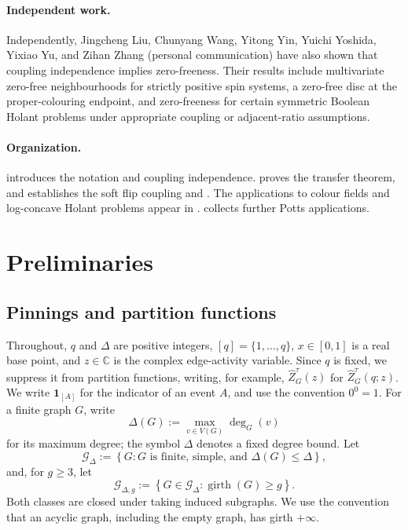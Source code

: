\documentclass[11pt,reqno]{article}
\theoremstyle{plain}
\theoremstyle{definition}
\theoremstyle{remark}
\theoremstyle{definition}
\theoremstyle{remark}
\newcommand{\C}{\mathbb{C}}
\newcommand{\set}[1]{\left\{#1\right\}}
\newcommand{\one}[1]{\mathbf{1}_{\left[#1\right]}}   %
\newcommand{\Deg}{\Delta}                        %
\newcommand{\colours}{[q]}                        %
\newcommand{\Gdeg}{\mathcal{G}_{\Deg}}
\newcommand{\Gdegg}[1]{\mathcal{G}_{\Deg,#1}}
\newcommand{\nZpin}[2]{\widehat Z_{#1}^{#2}}
\begin{document}
\paragraph{Independent work.}
Independently, Jingcheng Liu, Chunyang Wang, Yitong Yin, Yuichi Yoshida,
Yixiao Yu, and Zihan Zhang (personal communication) have also shown
that coupling independence implies zero-freeness.  Their results include
multivariate zero-free neighbourhoods for strictly positive spin systems,
a zero-free disc at the proper-colouring endpoint, and zero-freeness
for certain symmetric Boolean Holant problems under appropriate
coupling or adjacent-ratio assumptions.

\paragraph{Organization.}
 introduces the notation and coupling independence.
 proves the transfer theorem, and
 establishes the soft flip coupling and
.  The applications to colour fields and
log-concave Holant problems appear in .
 collects further Potts applications.

%
%
\section{Preliminaries}\label{sec:prelim}
%
\subsection{Pinnings and partition functions}\label{sec:potts-setup}

Throughout, \(q\) and \(\Deg\) are positive integers,
\(\colours=\{1,\ldots,q\}\), \(x\in[0,1]\) is a real base point, and
\(z\in\C\) is the complex edge-activity variable.  Since \(q\) is
fixed, we suppress it from partition functions, writing, for example,
\(\nZpin{G}{\tau}(z)\) for \(\nZpin{G}{\tau}(q;z)\).  We write \(\one{A}\)
for the indicator of an event \(A\), and use the convention \(0^0=1\).
For a finite graph \(G\), write
\[
  \Delta(G):=\max_{v\in V(G)}\deg_G(v)
\]
for its maximum degree; the symbol \(\Deg\) denotes a fixed degree bound.
Let
\[
  \Gdeg:=\set{G:\text{$G$ is finite, simple, and }\Delta(G)\le\Deg},
\]
and, for \(g\ge3\), let
\[
  \Gdegg{g}:=\set{G\in\Gdeg:\operatorname{girth}(G)\ge g}.
\]
Both classes are closed under taking induced subgraphs.  We use the convention that
an acyclic graph, including the empty graph, has girth \(+\infty\).
\end{document}
